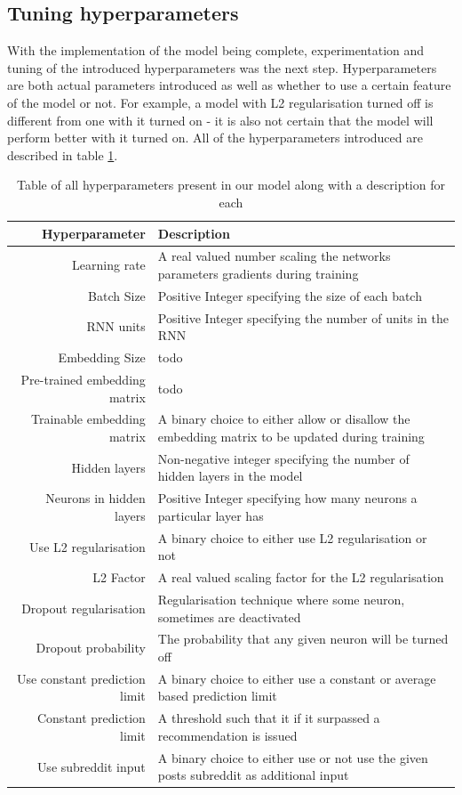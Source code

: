 \subsection{Tuning hyperparameters}
With the implementation of the model being complete, experimentation and tuning of the introduced hyperparameters was the next step. Hyperparameters are both actual parameters introduced as well as whether to use a certain feature of the model or not. For example, a model with L2 regularisation turned off is different from one with it turned on - it is also not certain that the model will perform better with it turned on. All of the hyperparameters introduced are described in table \ref{table:hyperparameters}.
\begin{table}[h!]
    \centering
    \begin{tabular}{ r  p{7cm} }
        \hline
        \textbf{Hyperparameter}  &  \textbf{Description} \\ \hline \hline
        Learning rate & A real valued number scaling the networks parameters gradients during training  \\ \hline
        Batch Size & Positive Integer specifying the size of each batch \\ \hline
        RNN units & Positive Integer specifying the number of units in the RNN  \\ \hline
        Embedding Size & todo \\ \hline
        Pre-trained embedding matrix & todo \\ \hline
        Trainable embedding matrix & A binary choice to either allow or disallow the embedding matrix to be updated during training \\ \hline
        Hidden layers & Non-negative integer specifying the number of hidden layers in the model \\ \hline
        Neurons in hidden layers & Positive Integer specifying how many neurons a particular layer has \\ \hline
        Use L2 regularisation & A binary choice to either use L2 regularisation or not \\ \hline
        L2 Factor & A real valued scaling factor for the L2 regularisation \\ \hline
        Dropout regularisation& Regularisation technique where some neuron, sometimes are deactivated \\ \hline
        Dropout probability & The probability that any given neuron will be turned off \\ \hline
        Use constant prediction limit & A binary choice to either use a constant or average based prediction limit \\ \hline
        Constant prediction limit & A threshold such that it if it surpassed a recommendation is issued  \\ \hline
        Use subreddit input & A binary choice to either use or not use the given posts subreddit as additional input \\ \hline
    \end{tabular}
    \caption{Table of all hyperparameters present in our model along with a description for each}
    \label{table:hyperparameters}
\end{table}
